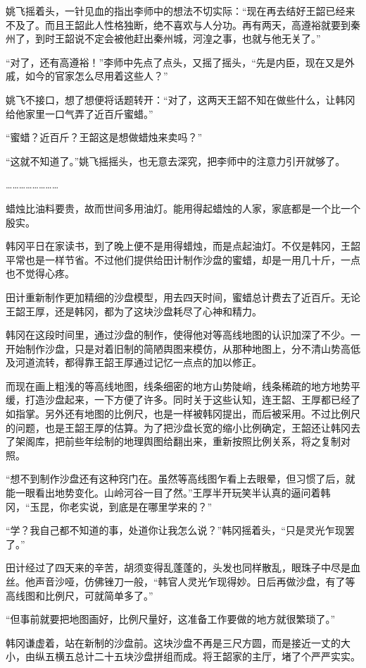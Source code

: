 姚飞摇着头，一针见血的指出李师中的想法不切实际：“现在再去结好王韶已经来不及了。而且王韶此人性格独断，绝不喜欢与人分功。再有两天，高遵裕就要到秦州了，到时王韶说不定会被他赶出秦州城，河湟之事，也就与他无关了。”

“对了，还有高遵裕！”李师中先点了点头，又摇了摇头，“先是内臣，现在又是外戚，如今的官家怎么尽用着这些人？”

姚飞不接口，想了想便将话题转开：“对了，这两天王韶不知在做些什么，让韩冈给他家里一口气弄了近百斤蜜蜡。”

“蜜蜡？近百斤？王韶这是想做蜡烛来卖吗？”

“这就不知道了。”姚飞摇摇头，也无意去深究，把李师中的注意力引开就够了。

……………………

蜡烛比油料要贵，故而世间多用油灯。能用得起蜡烛的人家，家底都是一个比一个殷实。

韩冈平日在家读书，到了晚上便不是用得蜡烛，而是点起油灯。不仅是韩冈，王韶平常也是一样节省。不过他们提供给田计制作沙盘的蜜蜡，却是一用几十斤，一点也不觉得心疼。

田计重新制作更加精细的沙盘模型，用去四天时间，蜜蜡总计费去了近百斤。无论王韶王厚，还是韩冈，都为了这块沙盘耗尽了心神和精力。

韩冈在这段时间里，通过沙盘的制作，使得他对等高线地图的认识加深了不少。一开始制作沙盘，只是对着旧制的简陋舆图来模仿，从那种地图上，分不清山势高低及河道流转，都得靠王韶王厚通过记忆一点点的加以修正。

而现在画上粗浅的等高线地图，线条细密的地方山势陡峭，线条稀疏的地方地势平缓，打造沙盘起来，一下方便了许多。同时关于这些认知，连王韶、王厚都已经了如指掌。另外还有地图的比例尺，也是一样被韩冈提出，而后被采用。不过比例尺的问题，也是王韶王厚的估算。为了把沙盘长宽的缩小比例确定，王韶还让韩冈去了架阁库，把前些年绘制的地理舆图给翻出来，重新按照比例关系，将之复制对照。

“想不到制作沙盘还有这种窍门在。虽然等高线图乍看上去眼晕，但习惯了后，就能一眼看出地势变化。山岭河谷一目了然。”王厚半开玩笑半认真的逼问着韩冈，“玉昆，你老实说，到底是在哪里学来的？”

“学？我自己都不知道的事，处道你让我怎么说？”韩冈摇着头，“只是灵光乍现罢了。”

田计经过了四天来的辛苦，胡须变得乱蓬蓬的，头发也同样散乱，眼珠子中尽是血丝。他声音沙哑，仿佛锉刀一般，“韩官人灵光乍现得妙。日后再做沙盘，有了等高线图和比例尺，可就简单多了。”

“但事前就要把地图画好，比例尺量好，这准备工作要做的地方就很繁琐了。”

韩冈谦虚着，站在新制的沙盘前。这块沙盘不再是三尺方圆，而是接近一丈的大小，由纵五横五总计二十五块沙盘拼组而成。将王韶家的主厅，堵了个严严实实。

